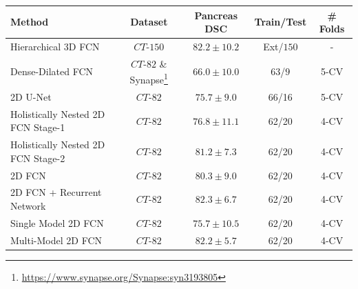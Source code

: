 \documentclass{article}
\begin{document}
\begin{table}\footnotesize
	\parbox{\textwidth}{
		\centering
		\label{tab:state_of_the_art_methods}
		\vspace{1 mm}
		\begin{tabular}{@{\extracolsep{1pt}}lcccc@{}} 
			Method  & Dataset & Pancreas DSC & Train/Test & \# Folds \\ \midrule
			
			Hierarchical 3D FCN \cite{roth2017hierarchical} & $CT$-$150$ & $82.2\pm10.2$ & Ext/$150$ & -\\
			
			Dense-Dilated FCN \cite{gibson2017towards} & $CT$-$82$ \& Synapse\footnote{\url{https://www.synapse.org/Synapse:syn3193805}} & $66.0\pm10.0$ & $63$/$9$ & 5-CV\\
			
			2D U-Net \cite{heinrich2018ternarynet} & $CT$-$82$ & $75.7\pm9.0$ & 66/16 & 5-CV\\ 
			
			Holistically Nested 2D FCN Stage-1\cite{roth2018media} & $CT$-$82$ & $76.8 \pm 11.1$ & 62/20& 4-CV\\
			
			Holistically Nested 2D FCN Stage-2\cite{roth2018media} & $CT$-$82$ & $81.2 \pm 7.3$ & 62/20& 4-CV\\
			
			2D FCN \cite{cai2017improving} & $CT$-$82$ & $80.3\pm9.0$ & 62/20 & 4-CV\\
			
			2D FCN + Recurrent Network \cite{cai2017improving} & $CT$-$82$ & $82.3 \pm 6.7$ & 62/20 & 4-CV\\
			
			Single Model 2D FCN \cite{zhou2017fixed} & $CT$-$82$ & $75.7 \pm 10.5$ & 62/20 & 4-CV\\
			
			Multi-Model 2D FCN \cite{zhou2017fixed} & $CT$-$82$ & $82.2 \pm 5.7$ & 62/20 & 4-CV\\
			
			\midrule
		\end{tabular}
	}
\end{table}
\end{document}

